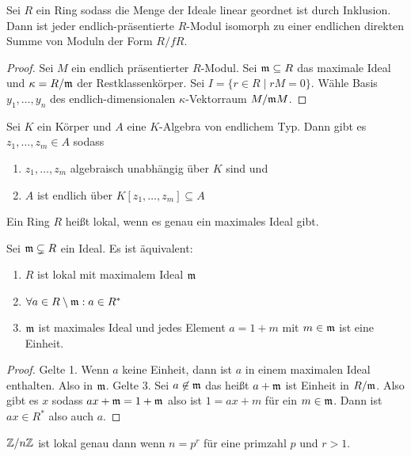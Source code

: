 \begin{Lemma}
    Sei $R$ ein Ring sodass die Menge der Ideale linear geordnet ist durch Inklusion. Dann ist jeder endlich-präsentierte $R$-Modul isomorph zu einer endlichen direkten Summe von Moduln der Form $R/fR$.
\end{Lemma}
\begin{proof}
    Sei $M$ ein endlich präsentierter $R$-Modul. Sei $\mathfrak{m}\subseteq R$ das maximale Ideal und $\kappa=R/\mathfrak{m}$ der Restklassenkörper. Sei $I=\{r\in R\mid rM=0\}$. Wähle Basis $y_1,\dots,y_n$ des endlich-dimensionalen $\kappa$-Vektorraum $M/\mathfrak{m} M$.
    
\end{proof}
\begin{Satz}\label{Satz:NoetherNor}
Sei $K$ ein Körper und $A$ eine $K$-Algebra von endlichem Typ. Dann gibt es $z_1,\dots,z_m\in A$ sodass
\begin{enumerate}
    \item $z_1,\dots,z_m$ algebraisch unabhängig über $K$ sind und
    \item $A$ ist endlich über $K[z_1,\dots,z_m]\subseteq A$
\end{enumerate}
\end{Satz}
\begin{Def}
    Ein Ring $R$ heißt lokal, wenn es genau ein maximales Ideal gibt.
\end{Def}
\begin{Satz}
    Sei $\mathfrak{m}\subsetneq R$ ein Ideal. Es ist äquivalent:
    \begin{enumerate}
        \item $R$ ist lokal mit maximalem Ideal $\mathfrak{m}$
        \item $\forall a\in R\setminus \mathfrak{m}: a\in R^*$
        \item $\mathfrak{m}$ ist maximales Ideal und jedes Element $a=1+m$ mit $m\in\mathfrak{m}$ ist eine Einheit.
    \end{enumerate}
\end{Satz}
\begin{proof}
    Gelte 1. Wenn $a$ keine Einheit, dann ist $a$ in einem maximalen Ideal enthalten. Also in $\mathfrak{m}$.
    Gelte 3. Sei $a\not \in\mathfrak{m}$ das heißt $a+\mathfrak{m}$ ist Einheit in $R/\mathfrak{m}$. Also gibt es $x$ sodass $ax+\mathfrak{m}=1+\mathfrak{m}$ also ist $1=ax+m$ für ein $m\in\mathfrak{m}$. Dann ist $ax\in R^*$ also auch $a$.
\end{proof}
\begin{Lemma}
    $\mathbb{Z}/n\mathbb{Z}$ ist lokal genau dann wenn $n=p^r$ für eine primzahl $p$ und $r>1$.
\end{Lemma}
